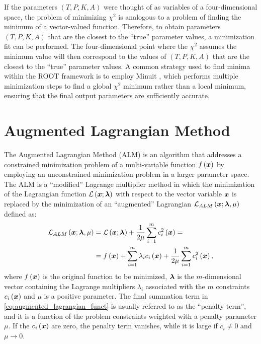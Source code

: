 If the parameters $\left(T,P,K,A\right)$ were thought of as variables of a four-dimensional space, the problem of minimizing $\chi^2$ is analogous to a problem of finding the minimum of a vector-valued function. Therefore, to obtain parameters $\left(T,P,K,A\right)$ that are the closest to the ``true'' parameter values, a minimization fit can be performed. The four-dimensional point where the $\chi^2$ assumes the minimum value will then correspond to the values of $\left(T,P,K,A\right)$ that are the closest to the ``true'' parameter values. A common strategy used to find minima within the ROOT framework is to employ Minuit \cite{JAMES1975343}, which performs multiple minimization steps to find a global $\chi^2$ minimum rather than a local minimum, ensuring that the final output parameters are sufficiently accurate.
\chapter{Augmented Lagrangian Method}\label{ch:alm_squared_min}
The Augmented Lagrangian Method (ALM) is an algorithm that addresses a constrained minimization problem of a multi-variable function $f\left(\boldsymbol{x}\right)$ by employing an unconstrained minimization problem in a larger parameter space. The ALM is a ``modified'' Lagrange multiplier method in which the minimization of the Lagrangian function $\mathcal{L}\left(\boldsymbol{x};\boldsymbol{\lambda}\right)$ with respect to the vector variable $\boldsymbol{x}$ is replaced by the minimization of an ``augmented'' Lagrangian $\mathcal{L}_{ALM}\left(\boldsymbol{x};\boldsymbol{\lambda},\mu\right)$ defined as:
\begin{equation}
	\begin{aligned} 
		\mathcal{L}_{ALM}\left(\boldsymbol{x};\boldsymbol{\lambda},\mu\right)&=\mathcal{L}\left(\boldsymbol{x};\boldsymbol{\lambda}\right)+\frac{1}{2\mu}\sum_{i=1}^{m}c_i^2\left(\boldsymbol{x}\right)=\\ 
		&=f\left(\boldsymbol{x}\right)+\sum_{i=1}^{m}\lambda_ic_i\left(\boldsymbol{x}\right)+\frac{1}{2\mu}\sum_{i=1}^{m}c_i^2\left(\boldsymbol{x}\right),
	\end{aligned}
	\label{eq:augmented_lagrangian_funct}
\end{equation}
where $f\left(\boldsymbol{x}\right)$ is the original function to be minimized, $\boldsymbol{\lambda}$ is the $m$-dimensional vector containing the Lagrange multipliers $\lambda_i$ associated with the $m$ constraints $c_i\left(\boldsymbol{x}\right)$ and $\mu$ is a positive parameter. The final summation term in \autoref{eq:augmented_lagrangian_funct} is usually referred to as the ``penalty term'', and it is a function of the problem constraints weighted with a penalty parameter $\mu$. If the $c_i\left(\boldsymbol{x}\right)$ are zero, the penalty term vanishes, while it is large if $c_i\ne0$ and $\mu\rightarrow0$.

